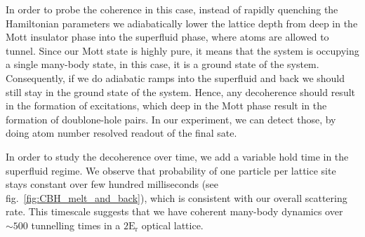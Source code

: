 In order to probe the coherence in this case, instead of rapidly quenching the Hamiltonian parameters we adiabatically lower the lattice depth from deep in the Mott insulator phase into the superfluid phase, where atoms are allowed to tunnel. Since our Mott state is highly pure, it means that the system is occupying a single many-body state, in this case, it is a ground state of the system. Consequently, if we do adiabatic ramps into the superfluid and back we should still stay in the ground state of the system. Hence, any decoherence should result in the formation of excitations, which deep in the Mott phase result in the formation of doublone-hole pairs. In our experiment, we can detect those, by doing atom number resolved readout of the final sate.

In order to study the decoherence over time, we add a variable hold time in the superfluid regime. We observe that probability of one particle per lattice site stays constant over few hundred milliseconds (see fig.~\ref{fig:CBH_melt_and_back}), which is consistent with our overall scattering rate. This timescale suggests that we have coherent many-body dynamics over $\sim 500$ tunnelling times in a $2 \mathrm{E_r}$ optical lattice.